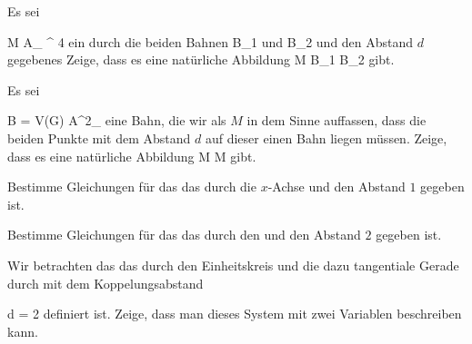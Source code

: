 {}
{





Es sei

\mavergleichskette
{\vergleichskette
{M
}
{ \subset }{ { {\mathbb A}_{ \R }^{  4   } }
}
{  }{
}
{    }{
}
{   }{
}
}
{}{}{}
ein durch die beiden Bahnen
\mathkor {} {B_1} {und} {B_2} {}
und den Abstand $d$ gegebenes
Zeige, dass es eine natürliche
Abbildung
\maabbdisp {} { M } { B_1 \times B_2
} {}
gibt.





}
{} {}

{}
{





Es sei

\mavergleichskettedisp
{\vergleichskette
{B
}
{ =} { V(G)
}
{ \subset} { {\mathbb A}^{2}_{\R}
}
{ } {
}
{ } {
}
}
{}{}{}
eine Bahn, die wir als
$M$ in dem Sinne auffassen, dass die beiden Punkte mit dem Abstand $d$ auf dieser einen Bahn liegen müssen. Zeige, dass es eine natürliche
Abbildung
\maabbdisp {} { M } { M
} {}
gibt.





}
{} {}

{}
{





Bestimme Gleichungen für das
das durch die $x$-Achse
 {} {}
und den Abstand $1$ gegeben ist.





}
{} {}

{}
{





Bestimme Gleichungen für das
das durch den
 {} {}
und den Abstand $2$ gegeben ist.





}
{} {}

{}
{





Wir betrachten das
das durch den Einheitskreis und die dazu tangentiale Gerade durch
 mit dem Koppelungsabstand

\mavergleichskette
{\vergleichskette
{ d
}
{ = }{ 2
}
{  }{
}
{    }{
}
{   }{
}
}
{}{}{}
definiert ist. Zeige, dass man dieses System mit zwei Variablen beschreiben kann.





}
{} {}

